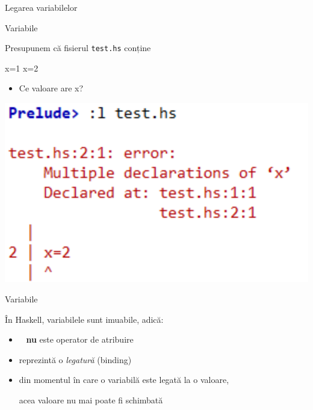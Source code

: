 \documentclass[xcolor=pdftex,romanian,colorlinks]{beamer}
\begin{document}
\begin{section}{Legarea variabilelor}
\begin{frame}[fragile]{Variabile}

 Presupunem că fisierul \verb"test.hs" conține
\begin{asciihs}
x=1
x=2
\end{asciihs}

\begin{itemize}
\item Ce valoare are  x?
\end{itemize}
\pause

\includegraphics[scale=.9]{test.png}


\end{frame}

\begin{frame}[fragile]{Variabile}

\begin{block}{
În Haskell, variabilele sunt imuabile, adică:}
\end{block}

\begin{itemize}
\item \structure{=} $\,\,\,$ {\bf nu} este operator de atribuire
\medskip

\item {} reprezintă o {\it legatură} (binding)
\medskip

\item din momentul în care o variabilă este legată la o valoare,

acea valoare nu mai poate fi schimbată


\end{itemize}


\end{frame}


\end{section}
\end{document}
